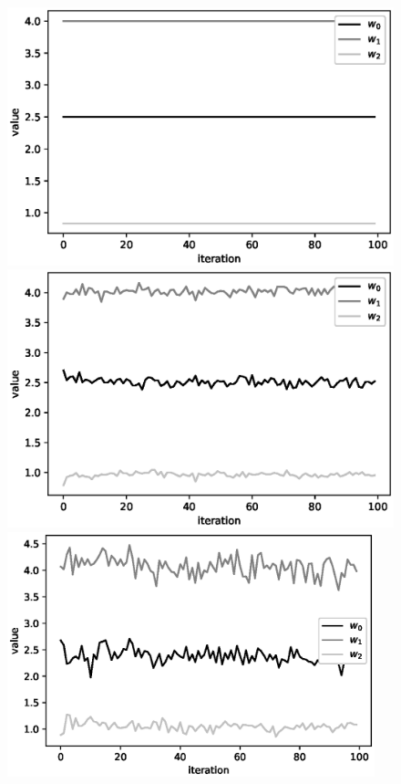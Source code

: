 \documentclass[12pt, twoside]{article}
\numberwithin{equation}{section}
\begin{document}
\begin{figure}[h]
\begin{minipage}{.32\textwidth}
\hspace{-3mm}
      \includegraphics[width = 1.05\textwidth]{figures/900noise.eps}
\end{minipage}
\begin{minipage}{.32\textwidth}
\hspace{-2.1mm}
      \includegraphics[width = \textwidth]{figures/901noise.eps}
\end{minipage}
\begin{minipage}{.32\textwidth}
\hspace{-2mm}
      \includegraphics[width = 0.95\textwidth]{figures/902noise.eps}

\end{minipage}
\end{figure}
\end{document}
